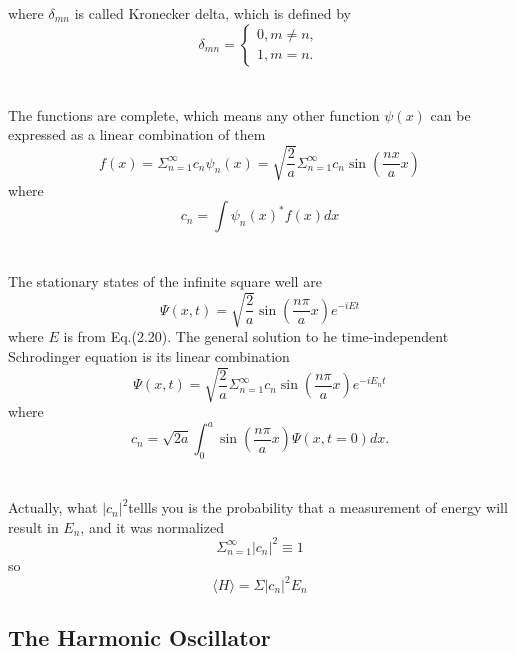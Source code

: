\documentclass{article}
\numberwithin{equation}{section}
\begin{document}
where $\delta_{mn}$ is called Kronecker delta, which is defined by
\begin{equation}
	\delta_{mn}=\begin{cases}
		0,m\neq n,\\
		1,m=n.
	\end{cases}
\end{equation}
\\
\\
The functions are complete, which means any other function $\psi(x)$ can be expressed as a linear combination of them
\begin{equation}
	f(x)=\Sigma_{n=1}^{\infty}c_n\psi_n(x)=\sqrt{\frac{2}{a}}\Sigma_{n=1}^{\infty}c_n\sin(\frac{nx}{a}x)
\end{equation}
where
\begin{equation}
	c_n=\int\psi_n(x)^*f(x)dx
\end{equation}
\\
\\
The stationary states of the infinite square well are
\begin{equation}
	\Psi(x,t)=\sqrt{\frac 2a}\sin(\frac{n\pi}{a}x)e^{-iEt}
\end{equation}
where $E$ is from Eq.(2.20). The general solution to he time-independent Schrodinger equation is its linear combination
\begin{equation}
	\Psi(x,t)=\sqrt{\frac 2a}\Sigma_{n=1}^{\infty}c_n\sin(\frac{n\pi}{a}x)e^{-iE_nt}
\end{equation}
where
\begin{equation}
	c_n=\sqrt{2a}\int_0^a\sin(\frac{n\pi}{a}x)\Psi(x,t=0)dx.
\end{equation}
\\
\\
Actually, what $|c_n|^2$tellls you is the probability that a measurement of energy will result in $E_n$, and it was normalized
\begin{equation}
	\Sigma_{n=1}^\infty |c_n|^2\equiv 1
\end{equation}
so
\begin{equation}
	\langle H\rangle=\Sigma |c_n|^2 E_n
\end{equation}
\subsection{The Harmonic Oscillator}
\end{document}
